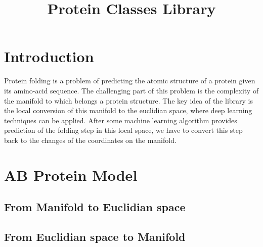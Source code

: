 \documentclass[a4paper,10pt]{article}
\title{Protein Classes Library}
\author{}
\begin{document}
\maketitle

\section{Introduction}
Protein folding is a problem of predicting the atomic structure of a protein given its amino-acid sequence. 
The challenging part of this problem is the complexity of the manifold to which belongs a protein structure.
The key idea of the library is the local conversion of this manifold to the euclidian space, where deep learning
techniques can be applied. After some machine learning algorithm provides prediction of the folding step in this 
local space, we have to convert this step back to the changes of the coordinates on the manifold.

\section{AB Protein Model}

\subsection{From Manifold to Euclidian space}


\subsection{From Euclidian space to Manifold}




\end{document}
